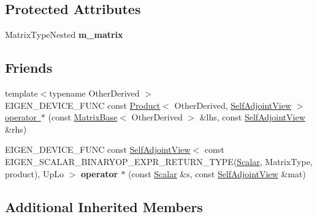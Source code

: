 \subsection*{Protected Attributes}
\begin{DoxyCompactItemize}
\item 
\mbox{\label{class_eigen_1_1_self_adjoint_view_aa9a5b0e28d3930a197bafc04ee96f546}} 
Matrix\+Type\+Nested {\bfseries m\+\_\+matrix}
\end{DoxyCompactItemize}
\subsection*{Friends}
\begin{DoxyCompactItemize}
\item 
{\footnotesize template$<$typename Other\+Derived $>$ }\\E\+I\+G\+E\+N\+\_\+\+D\+E\+V\+I\+C\+E\+\_\+\+F\+U\+NC const \mbox{\hyperlink{class_eigen_1_1_product}{Product}}$<$ Other\+Derived, \mbox{\hyperlink{class_eigen_1_1_self_adjoint_view}{Self\+Adjoint\+View}} $>$ \mbox{\hyperlink{class_eigen_1_1_self_adjoint_view_a54cb8708758a42bdce22bdf7f5ee890a}{operator $\ast$}} (const \mbox{\hyperlink{class_eigen_1_1_matrix_base}{Matrix\+Base}}$<$ Other\+Derived $>$ \&lhs, const \mbox{\hyperlink{class_eigen_1_1_self_adjoint_view}{Self\+Adjoint\+View}} \&rhs)
\item 
\mbox{\label{class_eigen_1_1_self_adjoint_view_a65535092144eccd44326882116cd38e6}} 
E\+I\+G\+E\+N\+\_\+\+D\+E\+V\+I\+C\+E\+\_\+\+F\+U\+NC const \mbox{\hyperlink{class_eigen_1_1_self_adjoint_view}{Self\+Adjoint\+View}}$<$ const E\+I\+G\+E\+N\+\_\+\+S\+C\+A\+L\+A\+R\+\_\+\+B\+I\+N\+A\+R\+Y\+O\+P\+\_\+\+E\+X\+P\+R\+\_\+\+R\+E\+T\+U\+R\+N\+\_\+\+T\+Y\+PE(\mbox{\hyperlink{class_eigen_1_1_self_adjoint_view_af52acc0942ece2de9b6db4a99cc6656e}{Scalar}}, Matrix\+Type, product), Up\+Lo $>$ {\bfseries operator $\ast$} (const \mbox{\hyperlink{class_eigen_1_1_self_adjoint_view_af52acc0942ece2de9b6db4a99cc6656e}{Scalar}} \&s, const \mbox{\hyperlink{class_eigen_1_1_self_adjoint_view}{Self\+Adjoint\+View}} \&mat)
\end{DoxyCompactItemize}
\subsection*{Additional Inherited Members}


